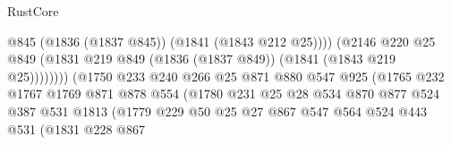 \begin{lexlean}{RustCore}
\begin{coremodule}
                                                @845
                                                (@1836 (@1837 @845))
                                                (@1841 (@1843 @212 @25))))
                                            (@2146
                                              @220
                                              @25
                                              @849
                                              (@1831
                                                @219
                                                @849
                                                (@1836 (@1837 @849))
                                                (@1841 (@1843 @219 @25))))))))
                                    (@1750
                                      @233
                                      @240
                                      @266
                                      @25
                                      @871
                                      @880
                                      @547
                                      @925
                                      (@1765
                                        @232
                                        @1767
                                        @1769
                                        @871
                                        @878
                                        @554
                                        (@1780
                                          @231
                                          @25
                                          @28
                                          @534
                                          @870
                                          @877
                                          @524
                                          @387
                                          @531
                                          @1813
                                          (@1779
                                            @229
                                            @50
                                            @25
                                            @27
                                            @867
                                            @547
                                            @564
                                            @524
                                            @443
                                            @531
                                            (@1831
                                              @228
                                              @867

\end{coremodule}
\end{lexlean}
